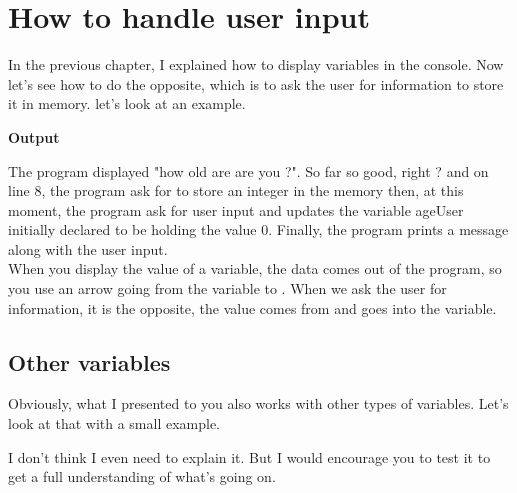 \documentclass[11pt, a4paper]{article}
\begin{document}
\section{How to handle user input}
In the previous chapter, I explained how to display variables in the console. 
Now let’s see how to do the opposite, which is to ask the user for information
to store it in memory. let's look at an example.

\textbf{Output}

The program displayed "how old are are you ?". So far so good, right ? and on line 8,
the program ask for to store an integer in the memory then, at this moment, the program
ask for user input and updates the variable ageUser initially declared to be holding the
value 0. Finally, the program prints a message along with the user input.\\
When you display the value of a variable, the data comes out of the program,
so you use an arrow going from the variable to . When we ask the user
for information, it is the opposite, the value comes from  and goes into the variable.

\subsection{Other variables}
Obviously, what I presented to you also works with other types of variables.
Let’s look at that with a small example.

I don’t think I even need to explain it. But I would encourage you to test
it to get a full understanding of what’s going on.
\end{document}
